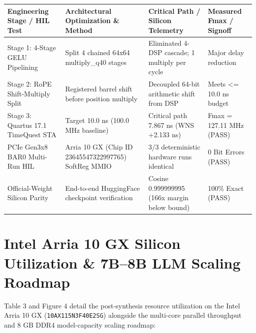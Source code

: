 \documentclass[11pt,a4paper]{article}
\begin{document}
{\footnotesize\renewcommand{\arraystretch}{1.14}\begin{longtable}{@{}L{0.23\textwidth}L{0.27\textwidth}L{0.24\textwidth}L{0.16\textwidth}@{}}\toprule

\textbf{Engineering Stage /\allowbreak{} HIL Test} & \textbf{Architectural Optimization \& Method} & \textbf{Critical Path /\allowbreak{} Silicon Telemetry} & \textbf{Measured Fmax /\allowbreak{} Signoff}\\\midrule\endhead

Stage 1: 4-Stage GELU Pipelining & Split 4 chained 64x64 multiply\_\allowbreak{}q40 stages & Eliminated 4-DSP cascade; 1 multiply per cycle & Major delay reduction\\[2pt]

Stage 2: RoPE Shift-Multiply Split & Registered barrel shift before position multiply & Decoupled 64-bit arithmetic shift from DSP & Meets <=\allowbreak{} 10.0 ns budget\\[2pt]

Stage 3: Quartus 17.1 TimeQuest STA & Target 10.0 ns (\allowbreak{}100.0 MHz baseline)\allowbreak{} & Critical path 7.867 ns (\allowbreak{}WNS +\allowbreak{}2.133 ns)\allowbreak{} & Fmax =\allowbreak{} 127.11 MHz (\allowbreak{}PASS)\allowbreak{}\\[2pt]

PCIe Gen3x8 BAR0 Multi-Run HIL & Arria 10 GX (\allowbreak{}Chip ID 23645547\allowbreak{}32299776\allowbreak{}5)\allowbreak{} SoftReg MMIO & 3/\allowbreak{}3 deterministic hardware runs identical & 0 Bit Errors (\allowbreak{}PASS)\allowbreak{}\\[2pt]

Official-Weight Silicon Parity & End-to-end HuggingFace checkpoint verification & Cosine 0.99999999\allowbreak{}5 (\allowbreak{}166x margin below bound)\allowbreak{} & 100\% Exact (\allowbreak{}PASS)\allowbreak{}\\[2pt]

\bottomrule\end{longtable}}

\section{Intel Arria 10 GX Silicon Utilization \& 7B--8B LLM Scaling Roadmap}

Table 3 and Figure 4 detail the post-synthesis resource utilization on the Intel Arria 10 GX (\texttt{10AX115N3F40E2SG}) alongside the multi-core parallel throughput and 8 GB DDR4 model-capacity scaling roadmap:
\end{document}
